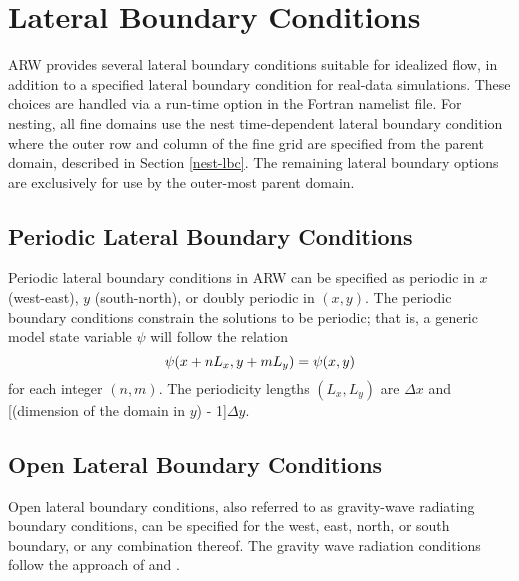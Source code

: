 \chapter{Lateral Boundary Conditions}
\label{lbc_chap}

ARW provides several lateral boundary conditions suitable 
for idealized flow, in addition to a specified lateral boundary
condition for real-data simulations.  These choices are
handled via a run-time option in the Fortran namelist file.
For nesting, all fine domains use the 
nest time-dependent lateral boundary condition where the outer row and column of the
fine grid are specified from the parent domain, described in 
Section \ref{nest-lbc}.
The remaining lateral boundary options are exclusively 
for use by the outer-most parent domain.

\section{Periodic Lateral Boundary Conditions}

Periodic lateral boundary conditions in ARW can be specified as
periodic in $x$ (west-east), $y$ (south-north), or doubly periodic in
$(x,y)$.  The periodic boundary conditions constrain the solutions to be
periodic; that is, a generic model state variable $\psi$ will follow
the relation 
% 
\begin{equation} \psi(x+nL_x,y+mL_y) = \psi(x,y)
\notag
\end{equation} 
% 
\noindent for each integer $(n,m)$.
The periodicity lengths $(L_x,L_y)$ are \hfil{}$\Delta x$ and
[(dimension of the domain in $y$) - 1]$\Delta y$.

\section{Open Lateral Boundary Conditions}

Open lateral boundary conditions, also referred to as gravity-wave
radiating boundary conditions, can be specified for the west, east, 
north, or south boundary, or any combination thereof.  
The gravity wave radiation conditions follow the approach of 
\citet{klemp_and_lilly78} and \citet{klemp78}.

